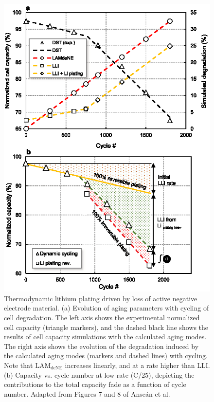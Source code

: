 \documentclass[journal=jpclcd,manuscript=article]{achemso}
\begin{document}
\begin{figure}[p]
    \centering
    \includegraphics[scale=1]{figures/thermo_plating_dubarry.eps}
    \caption{Thermodynamic lithium plating driven by loss of active negative electrode material. (a) Evolution of aging parameters with cycling of cell degradation. The left axis shows the experimental normalized cell capacity (triangle markers), and the dashed black line shows the results of cell capacity simulations with the calculated aging modes. The right axis shows the evolution of the degradation induced by the calculated aging modes (markers and dashed lines) with cycling. Note that $\mathrm{LAM_{deNE}}$ increases linearly, and at a rate higher than LLI.
    (b) Capacity vs. cycle number at low rate (C/25), depicting the contributions to the total capacity fade as a function of cycle number.
    Adapted from Figures 7 and 8 of Anse\'an et al.\cite{ansean_operando_2017}}
    \label{fig:thermo_plating}
\end{figure}
\end{document}
